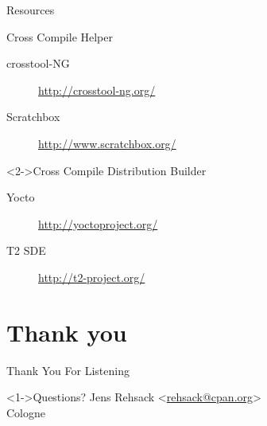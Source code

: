 \documentclass[ngerman,xcolor={table,dvipsnames},smaller,compress,hyperref={bookmarks,colorlinks}]{beamer}%
\begin{document}
\begin{frame}[fragile]{Resources}
\begin{block}{Cross Compile Helper}
\begin{description}
\item[crosstool-NG] \url{http://crosstool-ng.org/}
\item[Scratchbox] \url{http://www.scratchbox.org/}
\end{description}
\end{block}
\begin{block}<2->{Cross Compile Distribution Builder}
\begin{description}
\item[Yocto] \url{http://yoctoproject.org/}
\item[T2 SDE] \url{http://t2-project.org/}
\end{description}
\end{block}
\end{frame}

\section{Thank you}

\begin{frame}[fragile]{Thank You For Listening}
\begin{block}<1->{Questions?}
Jens Rehsack \textless{}\href{mailto:rehsack@cpan.org}{rehsack@cpan.org}\textgreater{} \\
Cologne
\end{block}
\end{frame}
\end{document}
